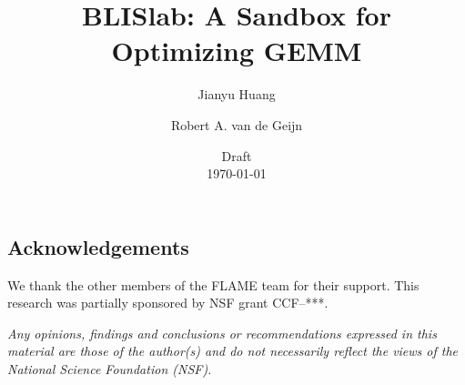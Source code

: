 \documentclass{article}
\begin{document}
\title{
BLISlab: A Sandbox for Optimizing GEMM
}

\author{
Jianyu Huang
\and
Robert A. van de Geijn
}

\date{Draft \\ \today}

\maketitle 

\begin{abstract}

\end{abstract}





\subsection*{Acknowledgements}
We thank the other members of the FLAME team for their support.
This research was partially sponsored by NSF grant CCF--***.

{\em Any opinions, findings and conclusions or recommendations
expressed in this material are those of the author(s) and do not
necessarily reflect the views of the National Science Foundation
(NSF).}


 

\end{document}
